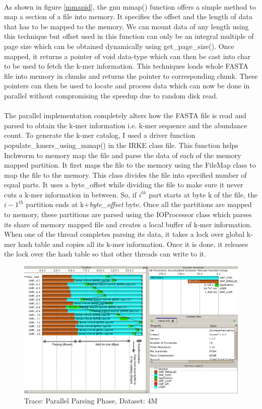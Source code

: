 \label{key}\documentclass[plainarticle, english ,zihtitle,final,hyperref,utf8]{zihpub}
\begin{document}
\paragraph{}As shown in figure \ref{mmapid}, the gnu mmap() function offers a simple method to map a section of a file into memory. It specifies the offset and the length of data that has to be mapped to the memory. We can mount data of any length using this technique but offset used in this function can only be an integral multiple of page size which can be obtained dynamically using get\_page\_size(). Once mapped, it returns a pointer of void data-type which can then be cast into char\* to be used to fetch the k-mer information. This techniques loads whole FASTA file into memory in chunks and returns the pointer to corresponding chunk. These pointers can then be used to locate and process data which can now be done in parallel without compromising the speedup due to random disk read. 
\paragraph{} The parallel implementation completely alters how the FASTA file is read and parsed to obtain the k-mer information i.e. k-mer sequence and the abundance count. To generate the k-mer catalog, I used a driver function populate\_kmers\_using\_mmap() in the IRKE class file. This function helps Inchworm to memory map the file and parse the data of each of the memory mapped partition. It first maps the file to the memory using the FileMap class to map the file to the memory. This class divides the file into specified number of equal parts. It uses a byte\_offset while dividing the file to make sure it never cuts a k-mer information in between. So, if $i^{th}$ part starts at byte k of the file, the $i-1^{th}$ partition ends at k+\emph{byte\_offset} byte. Once all the partitions are mapped to memory, these partitions are parsed using the IOProcessor class which parses its share of memory mapped file and creates a local buffer of k-mer information. When one of the thread completes parsing its data, it takes a lock over global k-mer hash table and copies all its k-mer information. Once it is done, it releases the lock over the hash table so that other threads can write to it. 
\begin{figure}[h]
\center
\includegraphics[scale=0.32]{Parse_trace}
\caption{Trace: Parallel Parsing Phase, Dataset: 4M}
\label{trace-parsing}
\end{figure}
\end{document}
